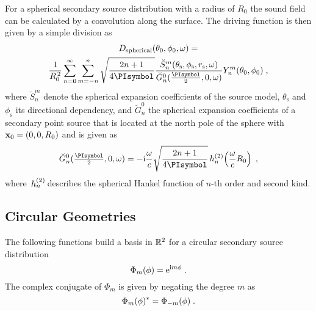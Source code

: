 For a spherical secondary source distribution with a radius of $R_0$
the sound field can be calculated by a convolution along the surface.
The driving function is then given by a simple division
as
%
\begin{multline}
    D_\text{spherical}(\theta_0,\phi_0,\omega) = \\ 
    \frac{1}{R_0^{\,2}}
    \sum_{n=0}^\infty \sum_{m=-n}^n \sqrt{\frac{2n+1}{4\PI}}
    \frac{\breve{S}_n^m(\theta_\text{s},\phi_\text{s},r_\text{s},\omega)}
    {\breve{G}_n^0(\frac{\PI}{2},0,\omega)} Y_n^m(\theta_0,\phi_0) \qc
    \label{eq:D_spherical}
\end{multline}
%
where $\breve{S}_n^m$ denote the spherical expansion
coefficients of the source model, $\theta_\text{s}$ and
$\phi_\text{s}$ its directional dependency, and $\breve{G}_n^0$
the spherical expansion coefficients of a
secondary point source that is located at the north pole of the sphere with $\mathbf{x}_0 =
(0,0,R_0)$ and is given as\autocite[][(25)]{Schultz2014}
%
\begin{equation}
    \breve{G}_n^0(\tfrac{\PI}{2},0,\omega) =
    -\I\omegac \sqrt{\frac{2n+1}{4\PI}} \h{n}{2}\left(\omegac R_0\right) \qc
    \label{eq:G_spherical}
\end{equation}
where $\,h_{n}^{(2)}\!$ describes the spherical Hankel function of $n$-th order and
second kind.


\subsection{Circular Geometries}
\label{sec:circular_geometries}

The following functions build a basis in $\mathbb{R}^2$ for a circular secondary source
distribution\autocite{Williams1999}
%
\begin{equation}
    \Phi_m(\phi) = \E^{\I m\phi} \qp
    \label{eq:circular_harmonics}
\end{equation}
%
The complex conjugate of $\Phi_m$ is given by negating the degree $m$ as
%
\begin{equation}
    \Phi_m(\phi)^* = \Phi_{-m}(\phi) \qp
    \label{eq:Phi_complex_conjugate}
\end{equation}
%

